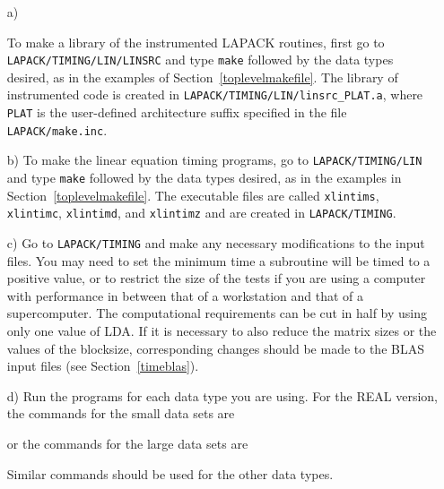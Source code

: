 \begin{itemize}
\item[a)]
\begin{sloppypar}
To make a library of the instrumented LAPACK routines, first
go to {\tt LAPACK/TIMING/LIN/LINSRC} and type {\tt make} followed
by the data types desired, as in the examples of Section~\ref{toplevelmakefile}. 
The library of instrumented code is created in
{\tt LAPACK/TIMING/LIN/linsrc\_PLAT.a},
where {\tt PLAT} is the user-defined architecture suffix specified in the
file {\tt LAPACK/make.inc}.
\end{sloppypar}

\item[b)]
To make the linear equation timing programs,
go to {\tt LAPACK/TIMING/LIN} and type {\tt make} followed by the data
types desired, as in the examples in Section~\ref{toplevelmakefile}.
The executable files are called {\tt xlintims},
{\tt xlintimc}, {\tt xlintimd}, and {\tt xlintimz} and are created
in {\tt LAPACK/TIMING}.

\item[c)]
Go to {\tt LAPACK/TIMING} and
make any necessary modifications to the input files.
You may need to set the minimum time a subroutine will
be timed to a positive value, or to restrict the size of the tests
if you are using a computer with performance in between that of a
workstation and that of a supercomputer.
The computational requirements can be cut in half by using only one
value of LDA.
If it is necessary to also reduce the matrix sizes or the values of
the blocksize, corresponding changes should be made to the 
BLAS input files (see Section~\ref{timeblas}).

\item[d)]
Run the programs for each data type you are using. 
For the REAL version, the commands for the small data sets are

or the commands for the large data sets are

\noindent
Similar commands should be used for the other data types.
\end{itemize}

